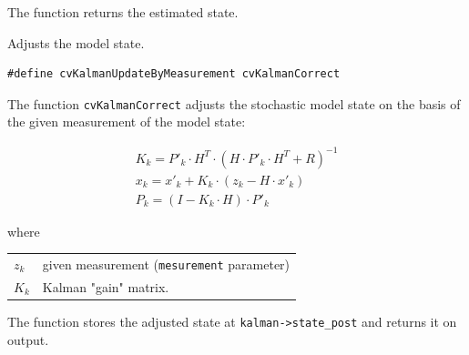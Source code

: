 The function returns the estimated state.

\label{KalmanCorrect}

Adjusts the model state.


\begin{lstlisting}
#define cvKalmanUpdateByMeasurement cvKalmanCorrect
\end{lstlisting}

\begin{description}
\end{description}

The function \texttt{cvKalmanCorrect} adjusts the stochastic model state on the basis of the given measurement of the model state:

\[
\begin{array}{l}
K_k=P'_k \cdot H^T \cdot (H \cdot P'_k \cdot H^T+R)^{-1}\\
x_k=x'_k+K_k \cdot (z_k-H \cdot x'_k)\\
P_k=(I-K_k \cdot H) \cdot P'_k
\end{array}
\]

where

\begin{tabular}{l p{4 in}}
$z_k$ & given measurement (\texttt{mesurement} parameter)\\
$K_k$ & Kalman "gain" matrix.
\end{tabular}

The function stores the adjusted state at \texttt{kalman->state\_post} and returns it on output.

